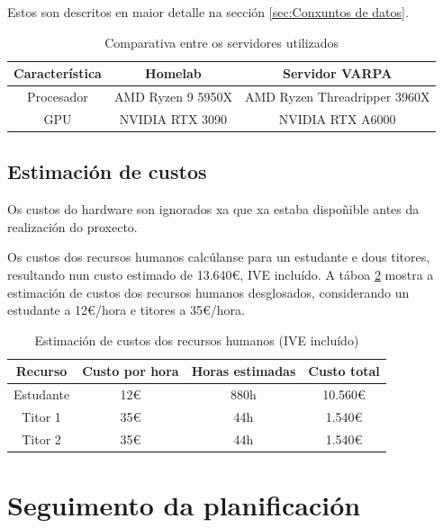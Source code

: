 Estos son descritos en maior detalle na sección \ref{sec:Conxuntos de datos}.

\begin{table}[h]
\centering
\begin{tabular}{|c|c|c|}
\hline
\textbf{Característica} & \textbf{Homelab} & \textbf{Servidor VARPA} \\ \hline
Procesador & AMD Ryzen 9 5950X&  AMD Ryzen Threadripper 3960X \\ \hline
GPU & NVIDIA RTX 3090 & NVIDIA RTX A6000  \\ \hline
\end{tabular}
\caption{Comparativa entre os servidores utilizados}
\label{tab:comparativa_servidores}
\end{table}


\subsection{Estimación de custos}
\label{subsec:Estimación de custos}

Os custos do hardware son ignorados xa que xa estaba dispoñible antes da realización do proxecto.

Os custos dos recursos humanos calcúlanse para un estudante e dous titores, resultando nun custo estimado de 13.640€, IVE incluído. A táboa \ref{tab:estimacion_custos} mostra a estimación de custos dos recursos humanos desglosados, considerando un estudante a 12€/hora e titores a 35€/hora.

\begin{table}[h]
\centering
\begin{tabular}{|c|c|c|c|}
\hline
\textbf{Recurso} & \textbf{Custo por hora} & \textbf{Horas estimadas} & \textbf{Custo total} \\ \hline
Estudante & 12€ & 880h & 10.560€ \\ \hline
Titor 1 & 35€ & 44h & 1.540€ \\ \hline
Titor 2 & 35€ & 44h & 1.540€ \\ \hline
\end{tabular}
\caption{Estimación de custos dos recursos humanos (IVE incluído)}
\label{tab:estimacion_custos}
\end{table}

\section{Seguimento da planificación}
\label{sec:Seguimento da planificación}

